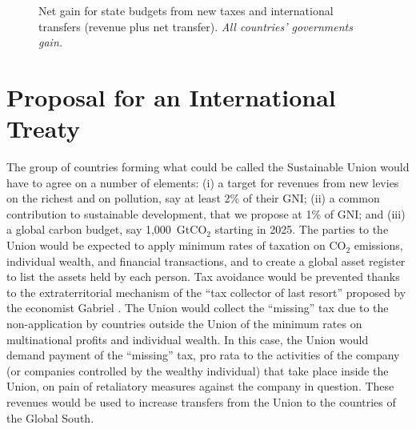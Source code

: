 \documentclass[12pt,english]{article}
\begin{document}
\begin{bibunit}
\begin{figure}[h!] 
    \caption{Net gain for state budgets from new taxes and international transfers (revenue plus net transfer). \textit{All countries' governments gain. }}\label{fig:budget_gain_both_taxes}
\end{figure}

\section{Proposal for an International Treaty}
The group of countries forming what could be called the Sustainable Union would have to agree on a number of elements: (i) a target for revenues from new levies on the richest and on pollution, say at least 2\% of their GNI; (ii) a common contribution to sustainable development, that we propose at 1\% of GNI; and (iii) a global carbon budget, say 1,000~GtCO$_\text{2}$ starting in 2025.
The parties to the Union would be expected to apply minimum rates of taxation on CO$_\text{2}$ emissions, individual wealth, and financial transactions, and to create a global asset register to list the assets held by each person. Tax avoidance would be prevented thanks to the extraterritorial mechanism of the ``tax collector of last resort'' proposed by the economist Gabriel \cite{zucman_blueprint_2024}. The Union would collect the ``missing'' tax due to the non-application by countries outside the Union of the minimum rates on multinational profits and individual wealth. In this case, the Union would demand payment of the “missing” tax, pro rata to the activities of the company (or companies controlled by the wealthy individual) that take place inside the Union, on pain of retaliatory measures against the company in question. These revenues would be used to increase transfers from the Union to the countries of the Global South.  


\end{bibunit}
\end{document}
